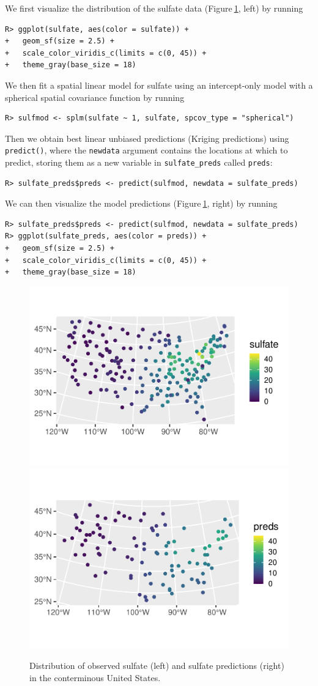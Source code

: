 \documentclass[10pt,letterpaper]{article}
\begin{document}
We first visualize the distribution of the sulfate data
(Figure\(~\)\ref{fig:sulfate}, left) by running

\begin{verbatim}
R> ggplot(sulfate, aes(color = sulfate)) +
+   geom_sf(size = 2.5) +
+   scale_color_viridis_c(limits = c(0, 45)) +
+   theme_gray(base_size = 18)
\end{verbatim}

We then fit a spatial linear model for sulfate using an intercept-only
model with a spherical spatial covariance function by running

\begin{verbatim}
R> sulfmod <- splm(sulfate ~ 1, sulfate, spcov_type = "spherical")
\end{verbatim}

Then we obtain best linear unbiased predictions (Kriging predictions)
using \texttt{predict()}, where the \texttt{newdata} argument contains
the locations at which to predict, storing them as a new variable in
\texttt{sulfate\_preds} called \texttt{preds}:

\begin{verbatim}
R> sulfate_preds$preds <- predict(sulfmod, newdata = sulfate_preds)
\end{verbatim}

We can then visualize the model predictions
(Figure\(~\)\ref{fig:sulfate}, right) by running

\begin{verbatim}
R> sulfate_preds$preds <- predict(sulfmod, newdata = sulfate_preds)
R> ggplot(sulfate_preds, aes(color = preds)) +
+   geom_sf(size = 2.5) +
+   scale_color_viridis_c(limits = c(0, 45)) +
+   theme_gray(base_size = 18)
\end{verbatim}

\begin{figure}

{\centering \includegraphics[width=0.49\linewidth]{preprint_files/figure-latex/sulfate-1} \includegraphics[width=0.49\linewidth]{preprint_files/figure-latex/sulfate-2} 

}

\caption{Distribution of observed sulfate (left) and sulfate predictions (right) in the conterminous United States.}\label{fig:sulfate}
\end{figure}
\end{document}
